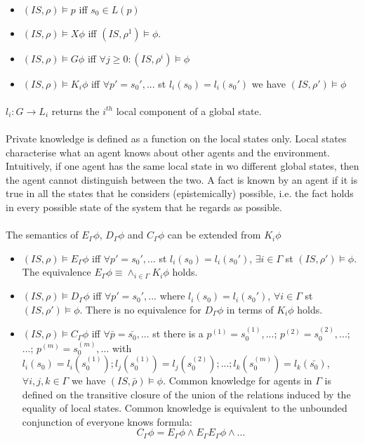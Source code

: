 \documentclass{article}
\theoremstyle{plain}
\theoremstyle{definition}
\begin{document}
\begin{multicols}{2}
\begin{itemize}
\item $(IS, \rho) \models p$ iff $s_0 \in L(p)$
\item $(IS, \rho) \models X\phi$ iff $(IS, \rho^1) \models \phi$.
\item $(IS, \rho) \models G\phi$ iff $\forall j \geq 0: (IS, \rho^i) \models \phi$
\item $(IS, \rho) \models K_i\phi$ iff $\forall p' = s_0',...$ st $l_i(s_0) = l_i(s_0')$ we have $(IS, \rho') \models \phi$
\end{itemize}

\paragraph{} $l_i: G \rightarrow L_i$ returns the $i^{th}$ local component of a global state.

\paragraph{} Private knowledge is defined as a function on the local states only. Local states characterise what an agent knows about other agents and the environment. Intuitively, if one agent has the same local state in wo different global states, then the agent cannot distinguish between the two. A fact is known by an agent if it is true in all the states that he considers (epistemically) possible, i.e. the fact holds in every possible state of the system that he regards as possible.

\paragraph{} The semantics of $E_\Gamma \phi$, $D_\Gamma \phi$ and $C_\Gamma \phi$ can be extended from $K_i\phi$

\begin{itemize}
\item $(IS, \rho) \models E_\Gamma \phi$ iff $\forall p' = s_0',...$ st $l_i(s_0) = l_i(s_0')$, $\exists i \in \Gamma$ st $(IS, \rho') \models \phi$. The equivalence $E_\Gamma \phi \equiv \land_{i \in \Gamma} K_i \phi$ holds.
\item $(IS, \rho) \models D_\Gamma \phi$ iff $\forall p' = s_0',...$ where $l_i(s_0) = l_i(s_0')$, $\forall i \in \Gamma$ st $(IS, \rho') \models \phi$. There is no equivalence for $D_\Gamma \phi$ in terms of $K_i \phi$ holds.
\item $(IS, \rho) \models C_\Gamma \phi$ iff $\forall \bar{p} = \bar{s_0},...$ st there is a $p^{(1)} = s_0^{(1)},...$; $p^{(2)} = s_0^{(2)},...$; ...; $p^{(m)} = s_0^{(m)},...$ with $l_i(s_0) = l_i(s_0^{(1)}); l_j(s_0^{(1)}) = l_j(s_0^{(2)});...;l_k(s_0^{(m)}) = l_k(\bar{s_0})$, $\forall i,j,k \in \Gamma$ we have $(IS, \bar{\rho}) \models \phi$. Common knowledge for agents in $\Gamma$ is defined on the transitive closure of the union of the relations induced by the equality of local states. Common knowledge is equivalent to the unbounded conjunction of everyone knows formula: $$C_\Gamma \phi = E_\Gamma \phi \land E_\Gamma E_\Gamma \phi \land ...$$
\end{itemize}


\end{multicols}
\end{document}
